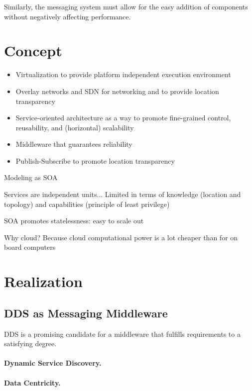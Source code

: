 Similarly, the messaging system must allow for the easy addition of components without negatively affecting performance.

\section{Concept}

\begin{itemize}
\item Virtualization to provide platform independent execution environment
\item Overlay networks and SDN for networking and to provide location transparency
\item Service-oriented architecture as a way to promote fine-grained control, reusability, and (horizontal) scalability
\item Middleware that guarantees reliability
\item Publish-Subscribe to promote location transparency
\end{itemize}

Modeling as SOA 

Services are independent units... Limited in terms of knowledge (location and topology) and capabilities (principle of least privilege)

SOA promotes statelessness: easy to scale out


Why cloud? Because cloud computational power is a lot cheaper than for on board computers


\section{Realization}


\subsection{DDS as Messaging Middleware}

DDS is a promising candidate for a middleware that fulfills requirements to a satisfying degree.

\paragraph{Dynamic Service Discovery.}

\paragraph{Data Centricity.}

